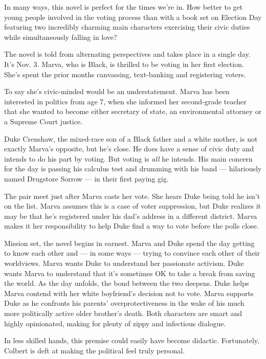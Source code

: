 In many ways, this novel is perfect for the times we're in. How better
to get young people involved in the voting process than with a book set
on Election Day featuring two incredibly charming main characters
exercising their civic duties while simultaneously falling in love?

The novel is told from alternating perspectives and takes place in a
single day. It's Nov. 3. Marva, who is Black, is thrilled to be voting
in her first election. She's spent the prior months canvassing,
text-banking and registering voters.

To say she's civic-minded would be an understatement. Marva has been
interested in politics from age 7, when she informed her second-grade
teacher that she wanted to become either secretary of state, an
environmental attorney or a Supreme Court justice.

Duke Crenshaw, the mixed-race son of a Black father and a white mother,
is not exactly Marva's opposite, but he's close. He does have a sense of
civic duty and intends to do his part by voting. But voting is
\emph{all} he intends. His main concern for the day is passing his
calculus test and drumming with his band --- hilariously named Drugstore
Sorrow --- in their first paying gig.

The pair meet just after Marva casts her vote. She hears Duke being told
he isn't on the list. Marva assumes this is a case of voter suppression,
but Duke realizes it may be that he's registered under his dad's address
in a different district. Marva makes it her responsibility to help Duke
find a way to vote before the polls close.

Mission set, the novel begins in earnest. Marva and Duke spend the day
getting to know each other and --- in some ways --- trying to convince
each other of their worldviews. Marva wants Duke to understand her
passionate activism. Duke wants Marva to understand that it's sometimes
OK to take a break from saving the world. As the day unfolds, the bond
between the two deepens. Duke helps Marva contend with her white
boyfriend's decision not to vote. Marva supports Duke as he confronts
his parents' overprotectiveness in the wake of his much more politically
active older brother's death. Both characters are smart and highly
opinionated, making for plenty of zippy and infectious dialogue.

In less skilled hands, this premise could easily have become didactic.
Fortunately, Colbert is deft at making the political feel truly
personal.

